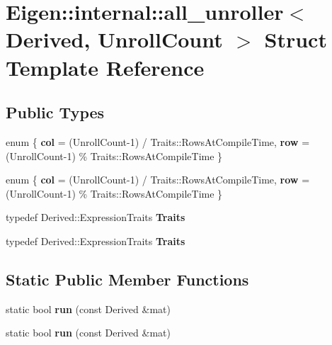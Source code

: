\hypertarget{struct_eigen_1_1internal_1_1all__unroller}{}\section{Eigen\+:\+:internal\+:\+:all\+\_\+unroller$<$ Derived, Unroll\+Count $>$ Struct Template Reference}
\label{struct_eigen_1_1internal_1_1all__unroller}
\subsection*{Public Types}
\begin{DoxyCompactItemize}
\item 
\mbox{\label{struct_eigen_1_1internal_1_1all__unroller_abf71c7a2d2210bb6c539a107f1adc6db}} 
enum \{ {\bfseries col} = (Unroll\+Count-\/1) / Traits\+:\+:Rows\+At\+Compile\+Time, 
{\bfseries row} = (Unroll\+Count-\/1) \% Traits\+:\+:Rows\+At\+Compile\+Time
 \}
\item 
\mbox{\label{struct_eigen_1_1internal_1_1all__unroller_a49dd439aa09a196df68cddeecf6b55fe}} 
enum \{ {\bfseries col} = (Unroll\+Count-\/1) / Traits\+:\+:Rows\+At\+Compile\+Time, 
{\bfseries row} = (Unroll\+Count-\/1) \% Traits\+:\+:Rows\+At\+Compile\+Time
 \}
\item 
\mbox{\label{struct_eigen_1_1internal_1_1all__unroller_a15d269678082201f46f0735e0adeff1e}} 
typedef Derived\+::\+Expression\+Traits {\bfseries Traits}
\item 
\mbox{\label{struct_eigen_1_1internal_1_1all__unroller_a15d269678082201f46f0735e0adeff1e}} 
typedef Derived\+::\+Expression\+Traits {\bfseries Traits}
\end{DoxyCompactItemize}
\subsection*{Static Public Member Functions}
\begin{DoxyCompactItemize}
\item 
\mbox{\label{struct_eigen_1_1internal_1_1all__unroller_ae703c58c22926d7c28e1714953e5083b}} 
static bool {\bfseries run} (const Derived \&mat)
\item 
\mbox{\label{struct_eigen_1_1internal_1_1all__unroller_ae703c58c22926d7c28e1714953e5083b}} 
static bool {\bfseries run} (const Derived \&mat)
\end{DoxyCompactItemize}


